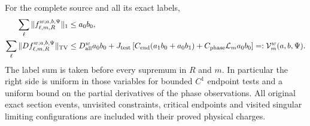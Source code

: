 \begin{theorem}
\label{thm:wo-bv}
For the complete source and all its exact labels,
\begin{align}
 \sum_\ell\|f^{w;a,b,\Psi}_{\ell,m,R}\|_1&\le a_0b_0,
                                                        \label{eq:wo-mass}\\
 \sum_\ell\|D f^{w;a,b,\Psi}_{\ell,m,R}\|_{\rm TV}
 &\le D_{\rm all}^w a_0b_0
 +J_{\rm test}\left[
 C_{\rm end}(a_1b_0+a_0b_1)
       +C_{\rm phase}\mathcal L_m a_0b_0\right]
 =:\mathcal V_m^w(a,b,\Psi).                         \label{eq:wo-variation}
\end{align}
The label sum is taken before every supremum in $R$ and $m$.
In particular the right side is uniform in those variables for
bounded $C^1$ endpoint tests and a uniform bound on the partial
derivatives of the phase observations.  All original exact section
events, unvisited constraints, critical endpoints and visited
singular limiting configurations are included with their proved
physical charges.
\end{theorem}
